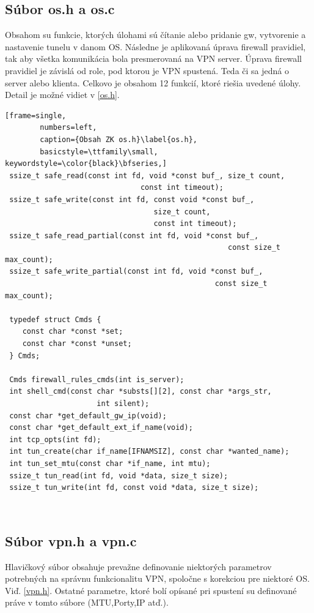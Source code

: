  \subsection{Súbor os.h a os.c}
 Obsahom su funkcie, ktorých úlohami sú čítanie alebo pridanie \acrshort{gw}, vytvorenie a nastavenie tunelu v danom OS. Následne je aplikovaná úprava firewall pravidiel, tak aby všetka komunikácia bola presmerovaná na VPN server. Úprava firewall pravidiel je závislá od role, pod ktorou je VPN spustená. Teda či sa jedná o server alebo klienta. 
 Celkovo je obsahom 12 funkcií, ktoré riešia uvedené úlohy. Detail je možné vidiet v \ref{os.h}.
 
 \begin{minipage}{\linewidth} 	
	\begin{lstlisting}[frame=single,
		numbers=left,
		caption={Obsah ZK os.h}\label{os.h},
		basicstyle=\ttfamily\small, keywordstyle=\color{black}\bfseries,]
 ssize_t safe_read(const int fd, void *const buf_, size_t count, 
 						       const int timeout);
 ssize_t safe_write(const int fd, const void *const buf_, 
 							      size_t count,
 							      const int timeout);
 ssize_t safe_read_partial(const int fd, void *const buf_,
 							 					   const size_t max_count);
 ssize_t safe_write_partial(const int fd, void *const buf_, 
 							    		     	const size_t max_count);
 
 typedef struct Cmds {
 	const char *const *set;
 	const char *const *unset;
 } Cmds;
 
 Cmds firewall_rules_cmds(int is_server);
 int shell_cmd(const char *substs[][2], const char *args_str,
 			         int silent);
 const char *get_default_gw_ip(void);
 const char *get_default_ext_if_name(void);
 int tcp_opts(int fd);
 int tun_create(char if_name[IFNAMSIZ], const char *wanted_name);
 int tun_set_mtu(const char *if_name, int mtu);
 ssize_t tun_read(int fd, void *data, size_t size);
 ssize_t tun_write(int fd, const void *data, size_t size); 
\end{lstlisting}
\end{minipage}\\ 
 \subsection{Súbor vpn.h a vpn.c}
 Hlavičkový súbor obsahuje prevažne definovanie niektorých parametrov potrebných na správnu funkcionalitu VPN, spoločne s korekciou pre niektoré OS. Viď. \ref{vpn.h}. Ostatné parametre, ktoré bolí opísané pri spustení su definované práve v tomto súbore (MTU,Porty,IP atď.).
 
